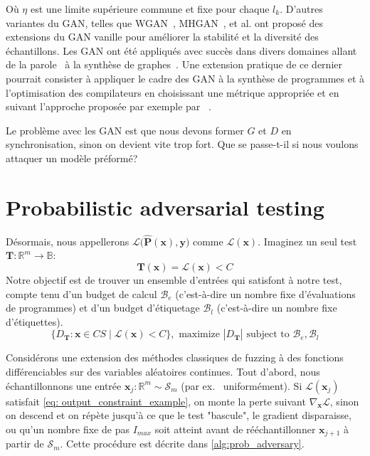 Où $\eta$ est une limite supérieure commune et fixe pour chaque $l_k$. D'autres variantes du GAN, telles que WGAN~\citep{arjovsky2017wgan}, MHGAN~\citep{turner2019mhgan}, et al. ont proposé des extensions du GAN vanille pour améliorer la stabilité et la diversité des échantillons. Les GAN ont été appliqués avec succès dans divers domaines allant de la parole~\citep{donahue2019wavegan} à la synthèse de graphes~\citep{wang2018graphgan}. Une extension pratique de ce dernier pourrait consister à appliquer le cadre des GAN à la synthèse de programmes et à l'optimisation des compilateurs en choisissant une métrique appropriée et en suivant l'approche proposée par exemple par ~\citet{adams2019learning, mendis2019compiler}.

Le problème avec les GAN est que nous devons former $G$ et $D$ en synchronisation, sinon on devient vite trop fort. Que se passe-t-il si nous voulons attaquer un modèle préformé?
%
\section{Probabilistic adversarial testing}\label{sec:prob_ad_test}

\noindent Désormais, nous appellerons $\mathcal{L}\big(\mathbf{\hat P}(\mathbf{x}), \mathbf{y}\big)$ comme $\mathcal{L}(\mathbf x)$. Imaginez un seul test $\mathbf{T}: \mathbb{R}^m \rightarrow \mathbb{B}$:
%
\begin{equation} \label{eq:output_constraint_example}
\mathbf T(\mathbf{x}) = \mathcal{L}(\mathbf{x}) < C
\end{equation}
%
Notre objectif est de trouver un ensemble d'entrées qui satisfont à notre test, compte tenu d'un budget de calcul $\mathcal{B}_e$ (c'est-à-dire un nombre fixe d'évaluations de programmes) et d'un budget d'étiquetage $\mathcal{B}_l$ (c'est-à-dire un nombre fixe d'étiquettes).
%
\begin{equation}
\{ D_\mathbf T: \mathbf x \in CS \mid \mathcal{L}(\mathbf{x}) < C\}, \text{ maximize } |D_\mathbf T| \text { subject to } \mathcal{B}_e, \mathcal{B}_l
\end{equation}
%

Considérons une extension des méthodes classiques de fuzzing à des fonctions différenciables sur des variables aléatoires continues. Tout d'abord, nous échantillonnons une entrée $\mathbf{x}_j: \mathbb{R}^m \sim \mathcal S_m$ (par ex. \ uniformément). Si $\mathcal{L}(\mathbf{x}_j)$ satisfait \autoref{eq: output_constraint_example}, on monte la perte suivant $\nabla_{\mathbf x}\mathcal{L}$, sinon on descend et on répète jusqu'à ce que le test "bascule", le gradient disparaisse, ou qu'un nombre fixe de pas $I_{max}$ soit atteint avant de rééchantillonner $\mathbf{x}_{j+1}$ à partir de $\mathcal S_m$. Cette procédure est décrite dans \autoref{alg:prob_adversary}.

